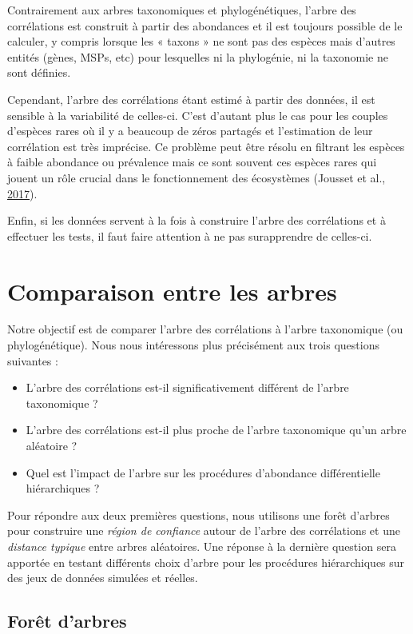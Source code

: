 \documentclass[12pt,a4paper]{reedthesis}
\theoremstyle{definition}
\theoremstyle{definition}
\theoremstyle{definition}
\theoremstyle{remark}
\begin{document}
Contrairement aux arbres taxonomiques et phylogénétiques, l'arbre des corrélations est construit à partir des abondances et il est toujours possible de le calculer, y compris lorsque les « taxons » ne sont pas des espèces mais d'autres entités (gènes, MSPs, etc) pour lesquelles ni la phylogénie, ni la taxonomie ne sont définies.

Cependant, l'arbre des corrélations étant estimé à partir des données, il est sensible à la variabilité de celles-ci. C'est d'autant plus le cas pour les couples d'espèces rares où il y a beaucoup de zéros partagés et l'estimation de leur corrélation est très imprécise. Ce problème peut être résolu en filtrant les espèces à faible abondance ou prévalence mais ce sont souvent ces espèces rares qui jouent un rôle crucial dans le fonctionnement des écosystèmes (Jousset et al., \protect\hyperlink{ref-jousset2017less}{2017}).

Enfin, si les données servent à la fois à construire l'arbre des corrélations et à effectuer les tests, il faut faire attention à ne pas surapprendre de celles-ci.

\hypertarget{comparaison-entre-les-arbres}{%
\section{Comparaison entre les arbres}\label{comparaison-entre-les-arbres}}

Notre objectif est de comparer l'arbre des corrélations à l'arbre taxonomique (ou phylogénétique). Nous nous intéressons plus précisément aux trois questions suivantes :
\begin{itemize}
\item
  L'arbre des corrélations est-il significativement différent de l'arbre taxonomique ?
\item
  L'arbre des corrélations est-il plus proche de l'arbre taxonomique qu'un arbre aléatoire ?
\item
  Quel est l'impact de l'arbre sur les procédures d'abondance différentielle hiérarchiques ?
\end{itemize}
Pour répondre aux deux premières questions, nous utilisons une forêt d'arbres pour construire une \emph{région de confiance} autour de l'arbre des corrélations et une \emph{distance typique} entre arbres aléatoires. Une réponse à la dernière question sera apportée en testant différents choix d'arbre pour les procédures hiérarchiques sur des jeux de données simulées et réelles.

\hypertarget{foruxeat-darbres}{%
\subsection{Forêt d'arbres}\label{foruxeat-darbres}}
\end{document}
